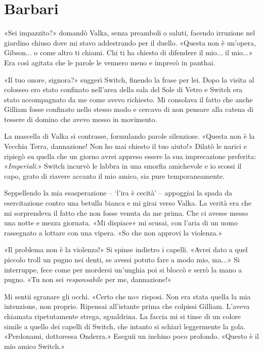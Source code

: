 \chapter{Barbari}

«Sei impazzito?» domandò Valka, senza preamboli o saluti, facendo
irruzione nel giardino chiuso dove mi stavo addestrando per il duello.
«Questa non è un'opera, Gibson... o come altro ti chiami. Chi ti ha
chiesto di difendere il mio... il mio...» Era così agitata che le parole
le vennero meno e imprecò in panthai.

«Il tuo onore, signora?» suggerì Switch, finendo la frase per lei. Dopo
la visita al colosseo ero stato confinato nell'area della sala del Sole
di Vetro e Switch era stato accompagnato da me come avevo richiesto. Mi
consolava il fatto che anche Gilliam fosse confinato nello stesso modo e
cercavo di non pensare alla catena di tessere di domino che avevo messo
in movimento.

La mascella di Valka si contrasse, formulando parole silenziose. «Questa
non è la Vecchia Terra, dannazione! Non ho mai chiesto il tuo aiuto!»
Dilatò le narici e ripiegò su quella che un giorno avrei appreso essere
la sua imprecazione preferita: «\emph{Imperiali}.» Switch incurvò le
labbra in una smorfia amichevole e io scossi il capo, grato di riavere
accanto il mio amico, sia pure temporaneamente.

Seppellendo la mia esasperazione -- `l'ira è cecità' -- appoggiai la
spada da esercitazione contro una betulla bianca e mi girai verso Valka.
La verità era che mi sorprendeva il fatto che non fosse venuta da me
prima. Che ci avesse messo una notte e mezza giornata. «Mi dispiace» mi
scusai, con l'aria di un uomo rassegnato a lottare con una vipera. «So
che non approvi la violenza.»

«Il problema non è la violenza!» Si spinse indietro i capelli. «Avrei
dato a quel piccolo troll un pugno nei denti, se avessi potuto fare a
modo mio, ma...» Si interruppe, fece come per mordersi un'unghia poi si
bloccò e serrò la mano a pugno. «Tu non sei \emph{responsabile} per me,
dannazione!»

Mi sentii sgranare gli occhi. «Certo che no» risposi. Non era stata
quella la mia intenzione, non proprio. Ripensai all'istante prima che
colpissi Gilliam. L'aveva chiamata ripetutamente strega, sgualdrina. La
faccia mi si tinse di un colore simile a quello dei capelli di Switch,
che intanto si schiarì leggermente la gola. «Perdonami, dottoressa
Onderra.» Eseguii un inchino poco profondo. «Questo è il mio amico
Switch.»

